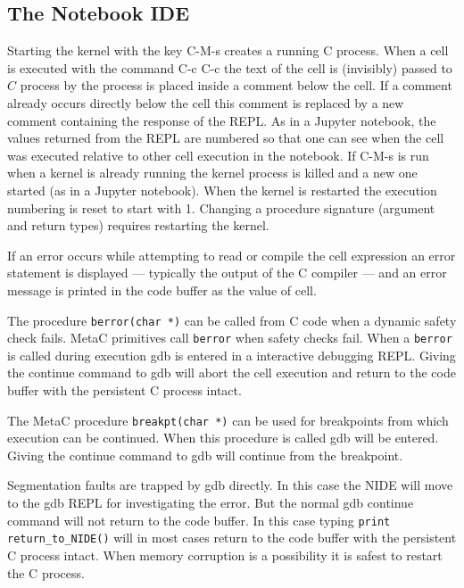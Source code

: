\documentclass{article}
\begin{document}
\subsection{The Notebook IDE}
\label{sec:Emacs}

Starting the kernel with the key C-M-s creates a running C process.  When a cell is executed
with the command C-c C-c the text of the cell is (invisibly) passed to $C$ process by the process is
placed inside a comment below the cell.  If a comment already occurs directly below the cell this
comment is replaced by a new comment containing the response of the REPL.  As in a Jupyter notebook,
the values returned from the REPL are numbered so that one can see when the cell was executed
relative to other cell execution in the notebook.  If C-M-s is run when a kernel is already running
the kernel process is killed and a new one started (as in a Jupyter notebook).  When the kernel is
restarted the execution numbering is reset to start with 1.  Changing a procedure signature
(argument and return types) requires restarting the kernel.


If an error occurs while attempting to read or compile the cell expression an error statement is displayed --- typically the output of the C compiler --- and
an error message is printed in the code buffer as the value of cell.

 The procedure {\tt berror(char *)} can be called from C code when a dynamic safety check fails.
MetaC primitives call {\tt berror} when safety checks fail.
When a {\tt berror} is called during execution gdb is entered in a interactive debugging REPL.  Giving the continue command to gdb will abort the cell execution and
return to the code buffer with the persistent C process intact.

The MetaC procedure {\tt breakpt(char *)} can be used for breakpoints from which execution can be continued.  When this procedure is called
gdb will be entered. Giving the continue command to gdb will continue from the breakpoint.

Segmentation faults are trapped by gdb directly.  In this case the
NIDE will move to the gdb REPL for investigating the error.  But
the normal gdb continue command will not return to the code buffer.
In this case typing {\tt print return\_to\_NIDE()} will in most cases
return to the code buffer with the persistent C process intact.  When
memory corruption is a possibility it is safest to restart the C
process.
\end{document}
